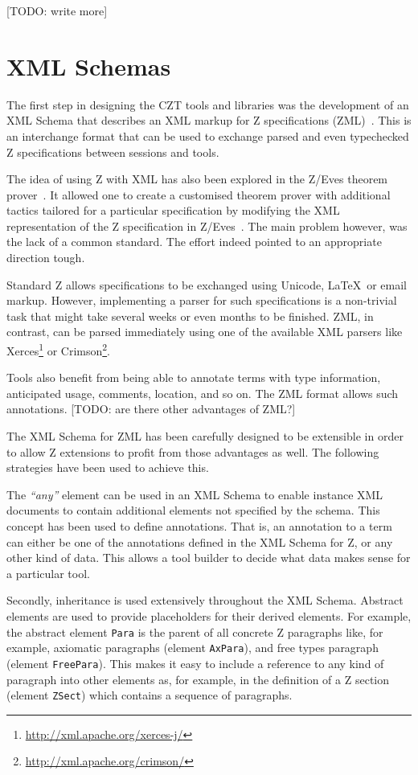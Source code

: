 \documentclass{llncs}
\newcommand{\Element}[1]{\texttt{#1}}
\begin{document}
  [TODO: write more]

\section{XML Schemas}

  The first step in designing the CZT tools and libraries was the
  development of an XML Schema that describes an XML markup for Z
  specifications (ZML)~\cite{UttEA:03}.  This is an interchange format
  that can be used to exchange parsed and even typechecked Z
  specifications between sessions and tools.

  The idea of using Z with XML has also been explored in the
  Z/Eves theorem prover~\cite{tp.tools:zeves.ref}. It allowed one to
  create a customised theorem prover with additional tactics tailored
  for a particular specification by modifying the XML representation
  of the Z specification in Z/Eves~\cite{tp.tools:zeves.api}.
  The main problem however, was the lack of a common standard.
  The effort indeed pointed to an appropriate direction tough.

  Standard Z allows specifications to be exchanged using Unicode,
  \LaTeX\ or email markup.  However, implementing a parser for such
  specifications is a non-trivial task that might take several weeks
  or even months to be finished.  ZML, in contrast, can be parsed
  immediately using one of the available XML parsers like
  Xerces\footnote{\url{http://xml.apache.org/xerces-j/}} or
  Crimson\footnote{\url{http://xml.apache.org/crimson/}}.

  Tools also benefit from being able to annotate terms with type
  information, anticipated usage, comments, location, and so on.
  The ZML format allows such annotations. [TODO: are there other advantages of ZML?]

  The XML Schema for ZML has been carefully designed to be extensible
  in order to allow Z extensions to profit from those advantages as well.
  The following strategies have been used to achieve this.

  The \textit{``any''} element can be used in an XML Schema to enable
  instance XML documents to contain additional elements not specified
  by the schema.  This concept has been used to define annotations.
  That is, an annotation to a term can either be one of the
  annotations defined in the XML Schema for Z, or any other kind of
  data.  This allows a tool builder to decide what data makes sense
  for a particular tool.

  Secondly, inheritance is used extensively throughout the XML Schema.
  Abstract elements are used to provide placeholders for their derived
  elements.  For example, the abstract element \Element{Para} is the
  parent of all concrete Z paragraphs like, for example, axiomatic
  paragraphs (element \Element{AxPara}), and free types paragraph
  (element \Element{FreePara}).  This makes it easy to include a
  reference to any kind of paragraph into other elements as, for
  example, in the definition of a Z section (element \Element{ZSect})
  which contains a sequence of paragraphs.
\end{document}
